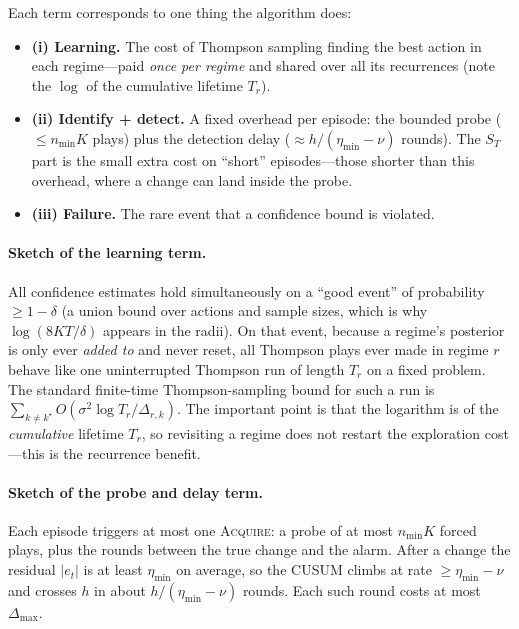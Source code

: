 \documentclass[11pt]{article}
\newcommand{\ACQ}{\textsc{Acquire}\xspace}
\begin{document}
Each term corresponds to one thing the algorithm does:
\begin{itemize}[leftmargin=1.6em,itemsep=1pt]
\item \textbf{(i) Learning.} The cost of Thompson sampling finding the best action in each
regime---paid \emph{once per regime} and shared over all its recurrences (note the $\log$ of the
cumulative lifetime $T_r$).
\item \textbf{(ii) Identify {}+{} detect.} A fixed overhead per episode: the bounded probe
($\le n_{\min}K$ plays) plus the detection delay ($\approx h/(\eta_{\min}-\nu)$ rounds). The
$S_T$ part is the small extra cost on ``short'' episodes---those shorter than this overhead, where
a change can land inside the probe.
\item \textbf{(iii) Failure.} The rare event that a confidence bound is violated.
\end{itemize}

\paragraph{Sketch of the learning term.}
All confidence estimates hold simultaneously on a ``good event'' of probability $\ge 1-\delta$
(a union bound over actions and sample sizes, which is why $\log(8KT/\delta)$ appears in the
radii). On that event, because a regime's posterior is only ever \emph{added to} and never reset,
all Thompson plays ever made in regime $r$ behave like one uninterrupted Thompson run of length
$T_r$ on a fixed problem. The standard finite-time Thompson-sampling bound for such a run is
$\sum_{k\ne k^\star}O(\sigma^2\log T_r/\Delta_{r,k})$. The important point is that the logarithm is
of the \emph{cumulative} lifetime $T_r$, so revisiting a regime does not restart the exploration
cost---this is the recurrence benefit.

\paragraph{Sketch of the probe and delay term.}
Each episode triggers at most one \ACQ: a probe of at most $n_{\min}K$ forced plays, plus the
rounds between the true change and the alarm. After a change the residual $|e_t|$ is at least
$\eta_{\min}$ on average, so the CUSUM climbs at rate $\ge\eta_{\min}-\nu$ and crosses $h$ in about
$h/(\eta_{\min}-\nu)$ rounds. Each such round costs at most $\Delta_{\max}$.
\end{document}
